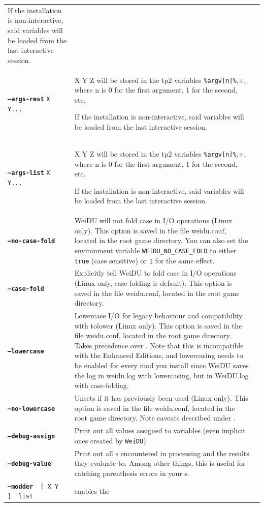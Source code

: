 \documentclass{article}
\def\ttref#1{\ahrefloc{#1}{\tt #1}}
\def\DEFINE#1{{\tt \bf #1}\label{#1}\index{#1}}
\def\t#1{{\tt #1}}
\def\Slist{{\color{red} list }}
\def\Ob{{\color{red} [ }}
\def\Oe{{\color{red} ] }}
\begin{document}
\begin{tabular}{lp{10in}|p{10in}}
If the installation is non-interactive, said variables will be loaded from the last interactive
session. \\
\DEFINE{--args-rest} \t{X Y...} & X Y Z will be stored in the tp2 variables \verb+%argv[n]%+,
where n is 0 for the first argument, 1 for the second, etc.

If the installation is non-interactive, said variables will be loaded from the last interactive
session. \\
\DEFINE{--args-list} \t{X Y...} & X Y Z will be stored in the tp2 variables \verb+%argv[n]%+,
where n is 0 for the first argument, 1 for the second, etc.

If the installation is non-interactive, said variables will be loaded from the last interactive
session. \\
\DEFINE{--no-case-fold} & WeiDU will not fold case in I/O operations
(Linux only). This option is saved in the file weidu.conf, located in
the root game directory. You can also set the environment variable
\t{WEIDU_NO_CASE_FOLD} to either \t{true} (case sensitive) or \t{1}
for the same effect. \\
\DEFINE{--case-fold} & Explicitly tell WeiDU to fold case in I/O
operations (Linux only, case-folding is default). This option is saved
in the file weidu.conf, located in the root game directory. \\
\DEFINE{--lowercase} & Lowercase I/O for legacy behaviour and
compatibility with tolower (Linux only). This option is saved in the
file weidu.conf, located in the root game directory. Takes precedence
over \ttref{--case-fold}. Note that this is incompatible with the
Enhanced Editions, and lowercasing needs to be enabled for every mod
you install since WeiDU saves the log in weidu.log with lowercasing,
but in WeiDU.log with case-folding. \\
\DEFINE{--no-lowercase} & Unsets \ttref{--lowercase} if it has
previously been used (Linux only). This option is saved in the file
weidu.conf, located in the root game directory. Note caveats described
under \ttref{--lowercase}. \\
\DEFINE{--debug-assign} & Print out all values assigned to \ttref{TP2}
variables (even implicit ones created by \t{WeiDU}). \\
\DEFINE{--debug-value} & Print out all \ttref{value}s encountered in
\ttref{TP2} processing and the results they evaluate to. Among other
things, this is useful for catching parenthesis errors in your
\ttref{value}s. \\
{\tt \DEFINE{--modder} \Ob X Y \Oe \Slist} & enables the

\end{tabular}
\end{document}
